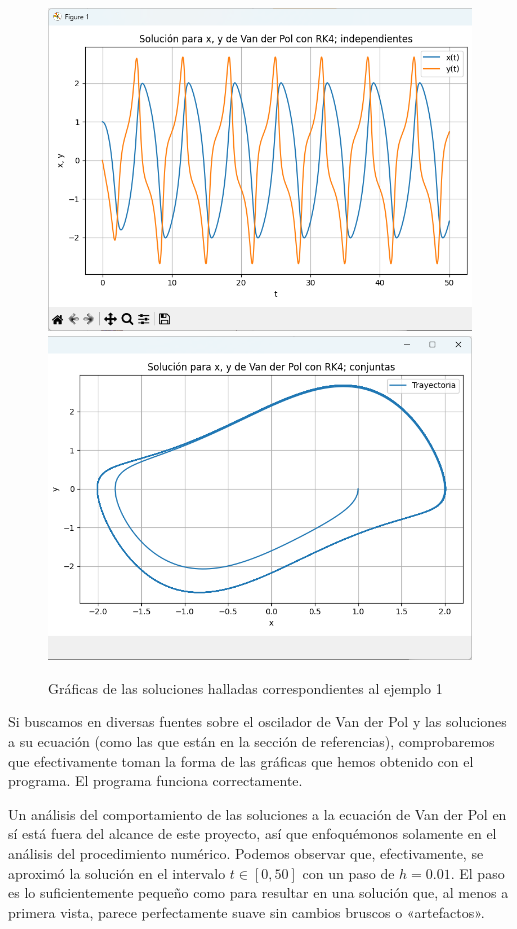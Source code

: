 \begin{figure}[H]\label{fig:ej1}
	\centering
	\includegraphics[scale=0.5]{../auxiliary/assets/ejemplo1-indiv.png}
	\includegraphics[scale=0.5]{../auxiliary/assets/ejemplo1-conj.png}
	\caption{Gráficas de las soluciones halladas correspondientes al ejemplo 1}
\end{figure}
Si buscamos en diversas fuentes sobre el oscilador de Van der Pol y las soluciones a su ecuación (como las que están en la sección de referencias), comprobaremos que efectivamente toman la forma de las gráficas que hemos obtenido con el programa. El programa funciona correctamente.

Un análisis del comportamiento de las soluciones a la ecuación de Van der Pol en sí está fuera del alcance de este proyecto, así que enfoquémonos solamente en el análisis del procedimiento numérico. Podemos observar que, efectivamente, se aproximó la solución en el intervalo \(t \in [0, 50]\) con un paso de \(h = 0.01\). El paso es lo suficientemente pequeño como para resultar en una solución que, al menos a primera vista, parece perfectamente suave sin cambios bruscos o «artefactos».

